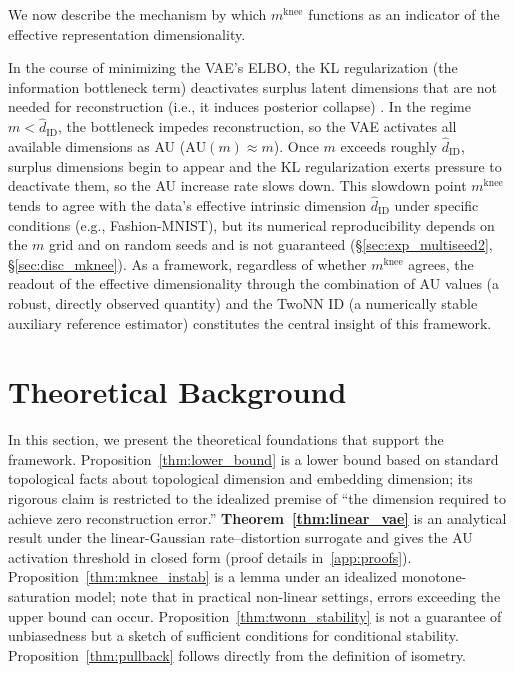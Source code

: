 \documentclass[make,article,submit,pdftex,moreauthors]{Definitions/mdpi}
\newcommand{\mknee}{m^{\mathrm{knee}}}
\begin{document}
We now describe the mechanism by which $\mknee$ functions as an indicator of the
effective representation dimensionality.

In the course of minimizing the VAE's ELBO, the KL regularization (the information
bottleneck term) deactivates surplus latent dimensions that are not needed for
reconstruction (i.e., it induces posterior collapse)
\cite{lucas2019elbo,higgins2017betavae}.
In the regime $m < \hat{d}_\mathrm{ID}$, the bottleneck impedes reconstruction, so the
VAE activates all available dimensions as AU ($\mathrm{AU}(m) \approx m$).
Once $m$ exceeds roughly $\hat{d}_\mathrm{ID}$, surplus dimensions begin to appear and
the KL regularization exerts pressure to deactivate them, so the AU increase rate
slows down.
This slowdown point $\mknee$ tends to agree with the data's effective intrinsic
dimension $\hat{d}_\mathrm{ID}$ under specific conditions (e.g., Fashion-MNIST),
but its numerical reproducibility depends on the $m$ grid and on random seeds
and is not guaranteed (§\ref{sec:exp_multiseed2}, §\ref{sec:disc_mknee}).
As a framework, regardless of whether $\mknee$ agrees, the readout of the
effective dimensionality through the combination of AU values (a robust, directly
observed quantity) and the TwoNN ID (a numerically stable auxiliary reference
estimator) constitutes the central insight of this framework.

\section{Theoretical Background}\label{sec:theory}

In this section, we present the theoretical foundations that support the framework.
Proposition~\ref{thm:lower_bound} is a lower bound based on standard topological facts
about topological dimension and embedding dimension; its rigorous claim is restricted to
the idealized premise of ``the dimension required to achieve zero reconstruction error.''
\textbf{Theorem~\ref{thm:linear_vae}} is an analytical result under the linear-Gaussian
rate--distortion surrogate and gives the AU activation threshold in closed form
(proof details in~\ref{app:proofs}).
Proposition~\ref{thm:mknee_instab} is a lemma under an idealized monotone-saturation model;
note that in practical non-linear settings, errors exceeding the upper bound can occur.
Proposition~\ref{thm:twonn_stability} is not a guarantee of unbiasedness but a sketch of
sufficient conditions for conditional stability.
Proposition~\ref{thm:pullback} follows directly from the definition of isometry.
\end{document}
